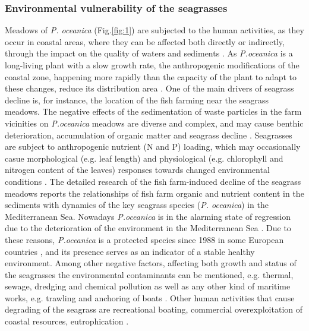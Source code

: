 \documentclass[11pt]{article}
\begin{document}
\subsubsection{Environmental vulnerability of the seagrasses}
Meadows of \textit{P. oceanica} (Fig.\ref{fig:1})\label{page-3} are subjected to the human activities, as they occur in coastal areas, where
they can be affected both directly \cite{Meinesz91}\label{Meinesz91} or indirectly, through the impact on the
quality of waters and sediments \cite{Duarte02}\label{Duarte02}. As \textit{P.oceanica} is a long-living plant with a slow
growth rate, the anthropogenic modifications of the coastal zone, happening more rapidly than the
capacity of the plant to adapt to these changes, reduce its distribution area \cite{Micheli05}\label{Micheli05}. 
One of the main drivers of seagrass decline is, for instance, the location of the fish farming near the
seagrass meadows. The negative effects of the sedimentation of waste particles in the farm vicinities
on \textit{P.oceanica} meadows are diverse and complex, and may cause benthic deterioration, accumulation
of organic matter and seagrass decline \cite{Holmer08}\label{Holmer08}. Seagrasses are subject to anthropogenic
nutrient (N and P) loading, which may occasionally casue morphological (e.g. leaf length) and
physiological (e.g. chlorophyll and nitrogen content of the leaves) responses towards changed
environmental conditions \cite{Leoni06,Leoni07}\label{Leoni06}\label{Leoni07}. 
The detailed research of the fish farm-induced decline of the seagrass meadows \cite{Diaz-Almela06}\label{Diaz-Almela06}reports the relationships of
fish farm organic and nutrient content in the sediments with dynamics of the key seagrass species (\textit{P.
oceanica}) in the Mediterranean Sea. Nowadays \textit{P.oceanica} is in the alarming state of regression due
to the deterioration of the environment in the Mediterranean Sea \cite{Ribed02}\label{Ribed02}. Due to these reasons,
\textit{P.oceanica} is a protected species since 1988 in some European countries \cite{Francour99}\label{Francour99}, and
its presence serves as an indicator of a stable healthy environment. Among other negative factors,
affecting both growth and status of the seagrasses the environmental contaminants can be mentioned,
e.g. thermal, sewage, dredging and chemical pollution  as well as any other kind of maritime works,
e.g. trawling and anchoring of boats \cite{Ribed02}\label{Ribed02}. Other human activities that cause degrading of the
seagrass are recreational boating, commercial overexploitation of coastal resources, eutrophication
\cite{McKenzie06}\label{McKenzie06}.
\end{document}
